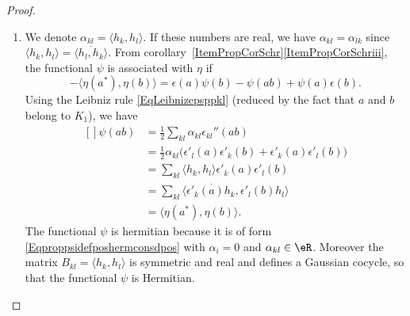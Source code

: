 \begin{proof}
	\begin{enumerate}
		\item
		      We denote $\alpha_{kl}=\langle h_k, h_l\rangle $. If these numbers are real, we have $\alpha_{kl}=\alpha_{lk}$ since $\langle h_k, h_l\rangle =\overline{ \langle h_l, h_k\rangle  }$. From corollary~\ref{ItemPropCorSchr}\ref{ItemPropCorSchriii}, the functional $\psi$ is associated with $\eta$ if
		      \begin{equation}
			      -\langle \eta(a^*), \eta(b)\rangle =\epsilon(a)\psi(b)-\psi(ab)+\psi(a)\epsilon(b).
		      \end{equation}
		      Using the Leibniz rule \eqref{EqLeibnizepsppkl} (reduced by the fact that $a$ and $b$ belong to $K_1$), we have
		      \begin{equation}
			      \begin{aligned}[]
				      \psi(ab) & =\frac{ 1 }{2}\sum_{kl}\alpha_{kl}\epsilon_{kl}''(ab)                                          \\
				               & =\frac{ 1 }{2}\alpha_{kl}\big( \epsilon'_l(a)\epsilon'_k(b)+\epsilon'_k(a)\epsilon'_l(b) \big) \\
				               & =\sum_{kl}\langle h_k, h_l\rangle \epsilon'_k(a)\epsilon'_l(b)                                 \\
				               & =\sum_{kl}\langle \overline{ \epsilon'_k(a)h_k }, \epsilon'_l(b)h_l\rangle                     \\
				               & =\langle \eta(a^*), \eta(b)\rangle .
			      \end{aligned}
		      \end{equation}
		      The functional $\psi$ is hermitian because it is of form \eqref{Eqproppsidefposhermconsdpos} with $\alpha_i=0$ and $\alpha_{kl}\in\eR$. Moreover the matrix $B_{kl}=\langle h_k, h_l\rangle $ is symmetric and real and defines a Gaussian cocycle, so that the functional $\psi$ is Hermitian.


\end{enumerate}
\end{proof}

